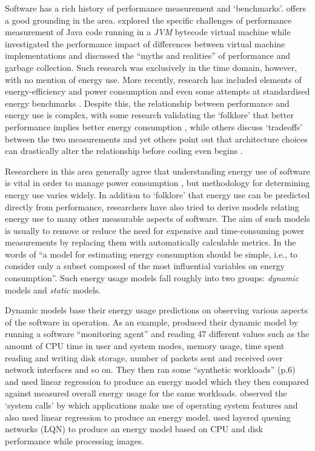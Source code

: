 Software has a rich history of performance measurement and `benchmarks'. \citet{Lilja2000} offers a good grounding in the area. \citet{Georges2007} explored the specific challenges of performance measurement of Java code running in a \emph{JVM} bytecode virtual machine while \citet{Gu2006} investigated the performance impact of differences between virtual machine implementations and \citet{Blackburn2004} discussed the \enquote{myths and realities} of performance and garbage collection. Such research was exclusively in the time domain, however, with no mention of energy use. More recently, research has included elements of energy-efficiency and power consumption \citep{Capra2012} \citep{Li2014b} and even some attempts at standardised energy benchmarks \citep{SPEC2008}. Despite this, the relationship between performance and energy use is complex, with some research validating the `folklore' that better performance implies better energy consumption \citep{Yuki2013}, while others discuss `tradeoffs' between the two measurements \citep{Joseph2001} and yet others point out that architecture choices can drastically alter the relationship before coding even begins \citep{Khomh2018}.

Researchers in this area generally agree that understanding energy use of software is vital in order to manage power consumption \citep{Snowdon2005}, but methodology for determining energy use varies widely. In addition to `folklore' that energy use can be predicted directly from performance, researchers have also tried to derive models relating energy use to many other measurable aspects of software. The aim of such models is usually to remove or reduce the need for expensive and time-consuming power measurements by replacing them with automatically calculable metrics. In the words of \citet{Povoa2013} \enquote{a model for estimating energy consumption should be simple, i.e., to consider only a subset composed of the most influential variables on energy consumption}. Such energy usage models fall roughly into two groups: \emph{dynamic} models and \emph{static} models.

Dynamic models base their energy usage predictions on observing various aspects of the software in operation. As an example, \citeauthor{Povoa2013} produced their dynamic model by running a software \enquote{monitoring agent} and reading 47 different values such as the amount of CPU time in user and system modes, memory usage, time spent reading and writing disk storage, number of packets sent and received over network interfaces and so on. They then ran some \enquote{synthetic workloads} (p.6) and used linear regression to produce an energy model which they then compared against measured overall energy usage for the same workloads. \citet{Chowdhury2015} observed the `system calls' by which applications make use of operating system features and also used linear regression to produce an energy model. \citet{Stoico2023} used layered queuing networks (LQN) to produce an energy model based on CPU and disk performance while processing images.

